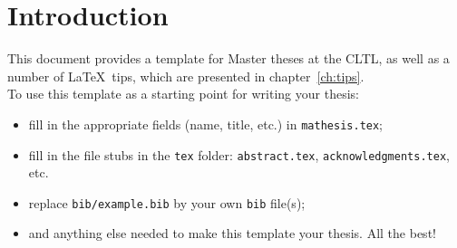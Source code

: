 \chapter{Introduction}

This document provides a template for Master theses at the CLTL, as well as a number of \LaTeX\ tips, which are presented in chapter~\ref{ch:tips}.\\

To use this template as a starting point for writing your thesis:
\begin{itemize}
\item fill in the appropriate fields (name, title, etc.) in \texttt{mathesis.tex};
\item fill in the file stubs in the \texttt{tex} folder: \texttt{abstract.tex}, \texttt{acknowledgments.tex}, etc.
\item replace \verb|bib/example.bib| by your own \texttt{bib} file(s);
\item and anything else needed to make this template your thesis. All the best!
\end{itemize}
